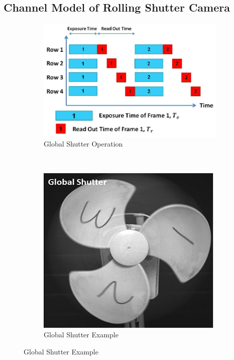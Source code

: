 \subsection{Channel Model of Rolling Shutter Camera}
\begin{figure}[!htb]
	\centering
	\begin{subfigure}[h]{0.3\textwidth}
		\includegraphics[width=\textwidth]{fig/global_shutter.png}
		\caption{Global Shutter Operation}
	\end{subfigure}
	~
	\begin{subfigure}[h]{0.1\textwidth}
		\includegraphics[width=\textwidth]{fig/fan_global}
		\caption{Global Shutter Example}

\end{subfigure}
\end{figure}
